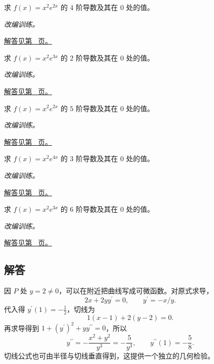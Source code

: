 \documentclass[12pt,fontset=fandol]{ctexart}
\begin{document}
\begin{example}\label{ex:c9q20}
求 $f(x)=x^2e^{2x}$ 的 $4$ 阶导数及其在 $0$ 处的值。
\par\textit{改编训练。}\par\hyperref[ans:c9q20]{解答见第~\pageref{ans:c9q20} 页。}
\end{example}
\begin{example}\label{ex:c9q21}
求 $f(x)=x^2e^{3x}$ 的 $2$ 阶导数及其在 $0$ 处的值。
\par\textit{改编训练。}\par\hyperref[ans:c9q21]{解答见第~\pageref{ans:c9q21} 页。}
\end{example}
\begin{example}\label{ex:c9q22}
求 $f(x)=x^2e^{2x}$ 的 $5$ 阶导数及其在 $0$ 处的值。
\par\textit{改编训练。}\par\hyperref[ans:c9q22]{解答见第~\pageref{ans:c9q22} 页。}
\end{example}
\begin{example}\label{ex:c9q23}
求 $f(x)=x^2e^{4x}$ 的 $3$ 阶导数及其在 $0$ 处的值。
\par\textit{改编训练。}\par\hyperref[ans:c9q23]{解答见第~\pageref{ans:c9q23} 页。}
\end{example}
\begin{example}\label{ex:c9q24}
求 $f(x)=x^2e^{3x}$ 的 $6$ 阶导数及其在 $0$ 处的值。
\par\textit{改编训练。}\par\hyperref[ans:c9q24]{解答见第~\pageref{ans:c9q24} 页。}
\end{example}
\subsection{解答}
\begin{solve}\label{ans:c9q1}
因 $P$ 处 $y=2\ne0$，可以在附近把曲线写成可微函数。对原式求导，
\[
2x+2yy^{{\prime}}=0,\qquad y^{{\prime}}=-x/y.
\]
代入得 $y^{\prime}(1)=-\frac{1}{2}$，切线为
\[
1(x-1)+2(y-2)=0.
\]
再求导得到 $1+(y^{\prime})^2+yy^{\prime\prime}=0$，所以
\[
y^{\prime\prime}=-\frac{x^2+y^2}{y^3}=-\frac{5}{y^3},\qquad y^{\prime\prime}(1)=-\frac{5}{8}.
\]
切线公式也可由半径与切线垂直得到，这提供一个独立的几何检验。
\end{solve}
\end{document}
